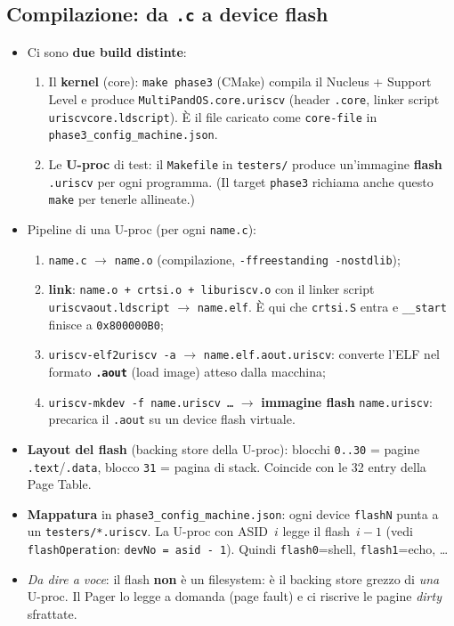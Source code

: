 \documentclass[11pt,a4paper]{article}
\newcommand{\code}[1]{\texttt{#1}}
\begin{document}
\subsection{Compilazione: da \code{.c} a device flash}
\begin{itemize}
\item Ci sono \textbf{due build distinte}:
  \begin{enumerate}
  \item Il \textbf{kernel} (core): \code{make phase3} (CMake) compila il Nucleus
    + Support Level e produce \code{MultiPandOS.core.uriscv} (header \code{.core},
    linker script \code{uriscvcore.ldscript}). È il file caricato come
    \code{core-file} in \code{phase3\_config\_machine.json}.
  \item Le \textbf{U-proc} di test: il \code{Makefile} in \code{testers/} produce
    un'immagine \textbf{flash} \code{.uriscv} per ogni programma. (Il target
    \code{phase3} richiama anche questo \code{make} per tenerle allineate.)
  \end{enumerate}
\item Pipeline di una U-proc (per ogni \code{name.c}):
  \begin{enumerate}
  \item \code{name.c} $\to$ \code{name.o} (compilazione, \code{-ffreestanding
    -nostdlib});
  \item \textbf{link}: \code{name.o + crtsi.o + liburiscv.o} con il linker script
    \code{uriscvaout.ldscript} $\to$ \code{name.elf}. È qui che \code{crtsi.S}
    entra e \code{\_\_start} finisce a \code{0x800000B0};
  \item \code{uriscv-elf2uriscv -a} $\to$ \code{name.elf.aout.uriscv}: converte
    l'ELF nel formato \textbf{\code{.aout}} (load image) atteso dalla macchina;
  \item \code{uriscv-mkdev -f name.uriscv \dots} $\to$ \textbf{immagine flash}
    \code{name.uriscv}: precarica il \code{.aout} su un device flash virtuale.
  \end{enumerate}
\item \textbf{Layout del flash} (backing store della U-proc): blocchi
  \code{0..30} = pagine \code{.text}/\code{.data}, blocco \code{31} = pagina di
  stack. Coincide con le 32 entry della Page Table.
\item \textbf{Mappatura} in \code{phase3\_config\_machine.json}: ogni device
  \code{flashN} punta a un \code{testers/*.uriscv}. La U-proc con ASID~$i$ legge
  il flash~$i-1$ (vedi \code{flashOperation}: \code{devNo = asid - 1}). Quindi
  \code{flash0}=shell, \code{flash1}=echo, \dots
\item \emph{Da dire a voce}: il flash \textbf{non} è un filesystem: è il backing
  store grezzo di \emph{una} U-proc. Il Pager lo legge a domanda (page fault) e
  ci riscrive le pagine \emph{dirty} sfrattate.
\end{itemize}
\end{document}
